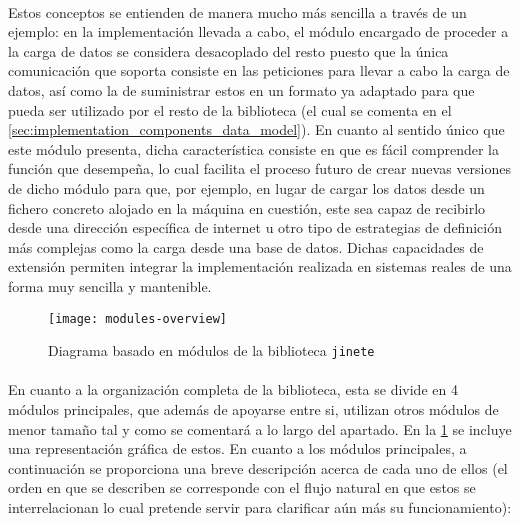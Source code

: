 \documentclass{subfiles}
\begin{document}
          \paragraph{}
          Estos conceptos se entienden de manera mucho más sencilla a través de un ejemplo: en la implementación llevada a cabo, el módulo encargado de proceder a la carga de datos se considera desacoplado del resto puesto que la única comunicación que soporta consiste en las peticiones para llevar a cabo la carga de datos, así como la de suministrar estos en un formato ya adaptado para que pueda ser utilizado por el resto de la biblioteca (el cual se comenta en el \cref{sec:implementation_components_data_model}). En cuanto al sentido único que este módulo presenta, dicha característica consiste en que es fácil comprender la función que desempeña, lo cual facilita el proceso futuro de crear nuevas versiones de dicho módulo para que, por ejemplo, en lugar de cargar los datos desde un fichero concreto alojado en la máquina en cuestión, este sea capaz de recibirlo desde una dirección específica de internet u otro tipo de estrategias de definición más complejas como la carga desde una base de datos. Dichas capacidades de extensión permiten integrar la implementación realizada en sistemas reales de una forma muy sencilla y mantenible.

          \begin{figure}[!ht]
            \centering
            \texttt{[image: modules-overview]}
            \caption{Diagrama basado en módulos de la biblioteca \texttt{jinete}}
            \label{img:modules_overview}
          \end{figure}

          \paragraph{}
          En cuanto a la organización completa de la biblioteca, esta se divide en 4 módulos principales, que además de apoyarse entre si, utilizan otros módulos de menor tamaño tal y como se comentará a lo largo del apartado. En la \cref{img:modules_overview} se incluye una representación gráfica de estos. En cuanto a los módulos principales, a continuación se proporciona una breve descripción acerca de cada uno de ellos (el orden en que se describen se corresponde con el flujo natural en que estos se interrelacionan lo cual pretende servir para clarificar aún más su funcionamiento):
\end{document}
